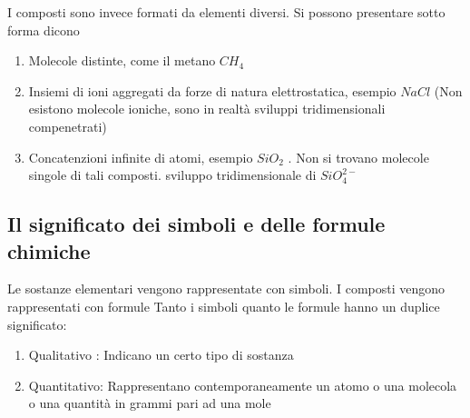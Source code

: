 \documentclass{article}
\begin{document}
I composti sono invece formati da elementi diversi. Si possono presentare sotto forma dicono 
\begin{enumerate}
    \item Molecole distinte, come il metano $CH_4$
    \item Insiemi di ioni aggregati da forze di natura elettrostatica, esempio $NaCl$ (Non esistono molecole
    ioniche, sono in realtà sviluppi tridimensionali compenetrati)
    \item Concatenzioni infinite di atomi, esempio $SiO_2$ . Non si trovano molecole singole di tali composti. sviluppo tridimensionale di $SiO_4^{2-}$
\end{enumerate}
\subsection{Il significato dei simboli e delle formule chimiche}
Le sostanze elementari vengono rappresentate con simboli. I composti vengono rappresentati con formule
Tanto i simboli quanto le formule hanno un duplice significato:
\begin{enumerate}
    \item Qualitativo : Indicano un certo tipo di sostanza
    \item Quantitativo: Rappresentano contemporaneamente un atomo o una molecola o una quantità in grammi pari ad una mole
\end{enumerate}
\end{document}

